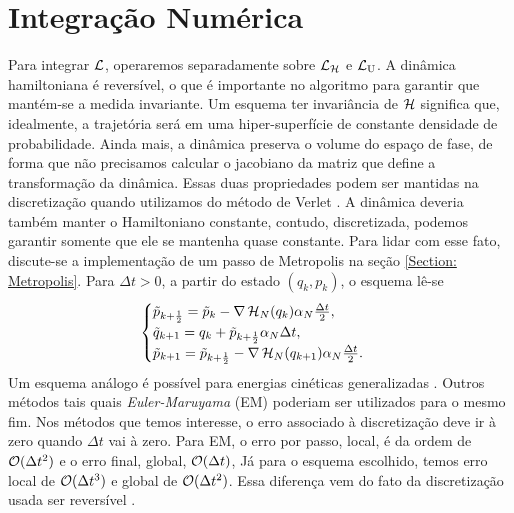 \section{Integração Numérica}
\label{Seção: Discretização}

Para integrar $\operatorname{\mathcal{L}}$, operaremos separadamente sobre $\operatorname{\mathcal{L}}_{\operatorname{\mathcal{H}}}$ e $\operatorname{\mathcal{L}}_{\operatorname{U}}$. A dinâmica hamiltoniana é reversível, o que é importante no algoritmo para garantir que mantém-se a medida invariante.  Um esquema ter invariância de $\operatorname{\mathcal{H}}$ significa que, idealmente, a trajetória será em uma hiper-superfície de constante densidade de probabilidade. Ainda mais, a dinâmica preserva o volume do espaço de fase, de forma que não precisamos calcular o jacobiano da matriz que define a transformação da dinâmica. Essas duas propriedades podem ser mantidas na discretização quando utilizamos do método de Verlet \cite{Chafa2018}\cite[Capítulo~2]{leimmolecular}. A dinâmica deveria também manter o Hamiltoniano constante, contudo, discretizada, podemos garantir somente que ele se mantenha quase constante. Para lidar com esse fato, discute-se a implementação de um passo de Metropolis na seção \ref{Section: Metropolis}. Para $\Delta t > 0$, a partir do estado $(q_k, p_k)$, o esquema lê-se
\begin{equation}
\begin{cases}
	\tilde{p}_{k+\frac{1}{2}} = \tilde{p}_k - \nabla \operatorname{\mathcal{H}}_N(q_k) \alpha_N \frac{\Delta t}{2}, \\
	\tilde{q}_{k+1} = q_k + \tilde{p}_{k + \frac{1}{2}} \alpha_N \Delta t, \\
	\tilde{p}_{k+1} = \tilde{p}_{k+\frac{1}{2}} - \nabla \operatorname{\mathcal{H}}_N(q_{k+1}) \alpha_N \frac{\Delta t}{2}.
\end{cases}
\label{Equation: Verlet}
\end{equation}
Um esquema análogo é possível para energias cinéticas generalizadas \cite{Stoltz2018}. Outros métodos tais quais \textit{Euler-Maruyama} (EM) \cite[Capítulo~7]{leimmolecular} poderiam ser utilizados para o mesmo fim. Nos métodos que temos interesse, o erro associado à discretização deve ir à zero quando $\Delta t$ vai à zero. Para EM, o erro por passo, local, é da ordem de $\mathcal{O}{(\Delta t^2)}$ e o erro final, global, $\mathcal{O}{(\Delta t)}$, Já para o esquema escolhido, temos erro local de  $\mathcal{O}{(\Delta t^3)}$ e global de  $\mathcal{O}{(\Delta t^2)}$. Essa diferença vem do fato da discretização usada ser reversível \cite[Capítulo~5]{handbookmontecarlo}. 

